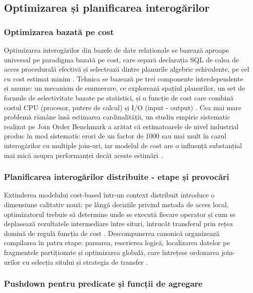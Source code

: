 \subsection{Optimizarea și planificarea interogărilor}

\subsubsection{Optimizarea bazată pe cost}

Optimizarea interogărilor din bazele de date relaționale se bazează aproape universal pe paradigma bazată pe cost, care separă declarația SQL de calea de acces procedurală efectivă și selectează dintre planurile algebric echivalente, pe cel cu cost estimat minim \cite{selinger1979}. Tehnica se bazează pe trei componente interdependente și anume: un mecanism de enumerare, ce explorează spațiul planurilor, un set de formule de selectivitate bazate pe statistici, și o funcție de cost care combină costul CPU (procesor, putere de calcul) și I/O (input - output) \cite{graefe1993query, graefe1995cascades}. Cea mai mare problemă rămâne însă estimarea cardinalității, un studiu empiric sistematic realizat pe Join Order Benchmark a arătat că estimatoarele de nivel industrial produc în mod sistematic erori de un factor de 1000 sau mai mult în cazul interogărilor cu multiple join-uri, iar modelul de cost are o influență substanțial mai mică asupra performanței decât aceste estimări~\cite{leis2015howgood}.

\subsubsection{Planificarea interogărilor distribuite - etape și provocări}

Extinderea modelului cost-based într-un context distribuit introduce
o dimensiune calitativ nouă: pe lângă deciziile privind metoda de
acces local, optimizatorul trebuie să determine unde se execută
fiecare operator și cum se deplasează rezultatele intermediare între
situri, întrucât transferul prin rețea domină de regulă funcția de
cost \cite{kossmann2000}. Descompunerea canonică organizează
compilarea în patru etape: parsarea, rescrierea logică, localizarea
datelor pe fragmentele partiționate și optimizarea globală, care
întrețese ordonarea join-urilor cu selecția sitului și strategia de
transfer \cite{ozsu2019}.

\subsubsection{Pushdown pentru predicate și funcții de agregare}

